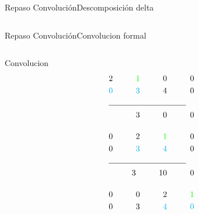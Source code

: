 \begin{frame}{Repaso Convolución}{Descomposición delta}
\begin{columns}[c]
\begin{column}{0.6\textwidth}
      \end{column}
   \end{columns}
   \vfill
\end{frame}
\begin{frame}{Repaso Convolución}{Convolucion formal}
   \begin{columns}[c]
      \begin{column}{0.4\textwidth}
      \tiny
      \tiny
      Convolucion
            \begin{align*}
                                2 \hspace{1cm} \textcolor{green}{1}\hspace{1cm}0 \hspace{1cm}0\\
               \textcolor{cyan}{0}\hspace{1cm} \textcolor{cyan} {3}\hspace{1cm}4 \hspace{1cm}0\\
               \cline{1-2}
               3\hspace{1cm} 0\hspace{1cm}0\\[0.4cm]
               0\hspace{1cm}                  2 \hspace{1cm}\textcolor{green}{1} \hspace{1cm}0\\
               0\hspace{1cm} \textcolor{cyan}{3}\hspace{1cm}\textcolor{cyan} {4} \hspace{1cm}0\\
               \cline{1-2}
               3\hspace{1cm} 10\hspace{1cm}0\\[0.4cm]
               0\hspace{1cm} 0\hspace{1cm}                 2 \hspace{1cm}\textcolor{green}{1}\\
               0\hspace{1cm} 3\hspace{1cm}\textcolor{cyan}{4}\hspace{1cm}\textcolor{cyan} {0}\\

\end{align*}
\end{column}
\end{columns}
\end{frame}
